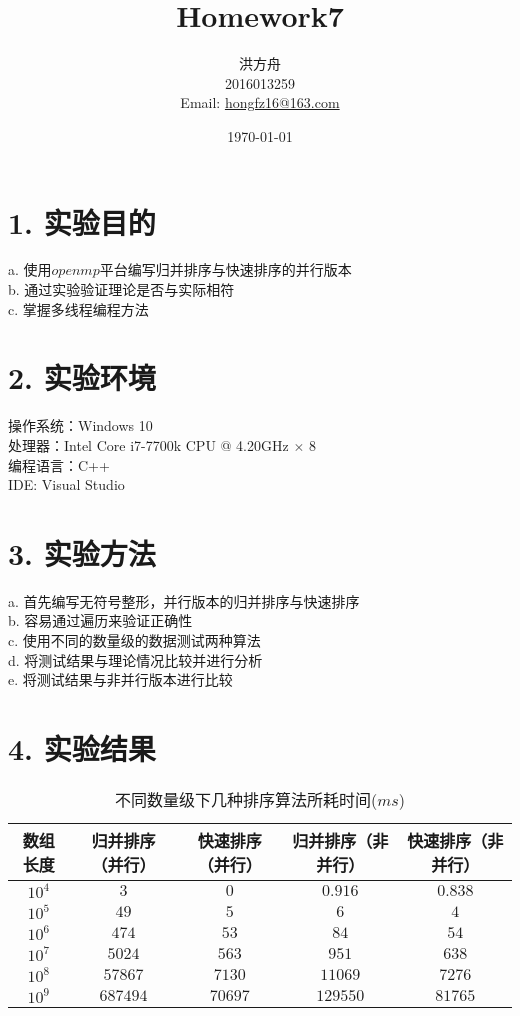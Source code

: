 \documentclass[12pt]{article}
\title{Homework7}
\author{洪方舟\\2016013259\\Email: \href{mailto:hongfz16@163.com}{hongfz16@163.com}}
\date{\today}
\begin{document}
  \maketitle
  \setlength\parindent{0em}
  \section*{1. 实验目的}
  a. 使用$openmp$平台编写归并排序与快速排序的并行版本\\
  b. 通过实验验证理论是否与实际相符\\
  c. 掌握多线程编程方法
  \section*{2. 实验环境}
  操作系统：Windows 10\\
  处理器：Intel Core i7-7700k CPU @ 4.20GHz $\times$ 8\\
  编程语言：C++\\
  IDE: Visual Studio
  \section*{3. 实验方法}
  a. 首先编写无符号整形，并行版本的归并排序与快速排序\\
  b. 容易通过遍历来验证正确性\\
  c. 使用不同的数量级的数据测试两种算法\\
  d. 将测试结果与理论情况比较并进行分析\\
  e. 将测试结果与非并行版本进行比较
  \newpage
  \section*{4. 实验结果}
  \begin{table}[h!]
  	\begin{center}
  		\caption{不同数量级下几种排序算法所耗时间($ms$)}
  		\begin{tabular}{c|c|c|c|c}
  			\toprule
  			\textbf{数组长度} & \textbf{归并排序（并行）} & \textbf{快速排序（并行）} & \textbf{归并排序（非并行）} & \textbf{快速排序（非并行）} \\
  			\midrule
  			$10^4$ & $3$ & $0$ & $0.916$ & $0.838$ \\
  			$10^5$ & $49$ & $5$ & $6$ & $4$ \\
  			$10^6$ & $474$ & $53$ & $84$ & $54$ \\
  			$10^7$ & $5024$ & $563$ & $951$ & $638$ \\
  			$10^8$ & $57867$ & $7130$ & $11069$ & $7276$ \\
  			$10^9$ & $687494$ & $70697$ & $129550$ & $81765$ \\
  			\bottomrule
  		\end{tabular}
  	\end{center}
  \end{table}
\end{document}
